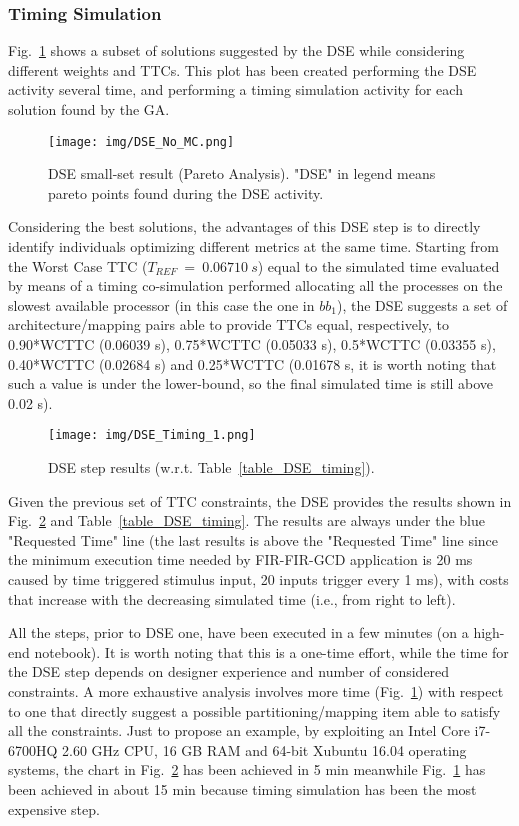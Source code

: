 \subsubsection{Timing Simulation}\label{firfirgcd_nomc}
%
Fig.~\ref{dse_small_01} shows a subset of solutions suggested by the DSE while considering different weights and TTCs. This plot has been created performing the DSE activity several time, and performing a timing simulation activity for each solution found by the GA.  \par
%
\begin{figure}[htbp]
	\centerline{\texttt{[image: img/DSE\_No\_MC.png]}}
	\caption{DSE small-set result (Pareto Analysis). "DSE" in legend means pareto points found during the DSE activity.}
	\label{dse_small_01}
\end{figure}
%
Considering the best solutions, the advantages of this DSE step is to directly identify individuals optimizing different metrics at the same time. Starting from the Worst Case TTC ($T_{REF} \ = \ 0.06710 \ s$) equal to the simulated time evaluated by means of a timing co-simulation performed allocating all the processes on the slowest available processor (in this case the one in $bb_1$), the DSE suggests a set of architecture/mapping pairs able to provide TTCs equal, respectively, to 0.90*WCTTC (0.06039 s), 0.75*WCTTC (0.05033 s), 0.5*WCTTC (0.03355 s), 0.40*WCTTC (0.02684 s) and 0.25*WCTTC (0.01678 s, it is worth noting that such a value is under the lower-bound, so the final simulated time is still above 0.02 s). \par
%
\begin{figure}[htbp]
	\centerline{\texttt{[image: img/DSE\_Timing\_1.png]}}
	\caption{DSE step results (w.r.t. Table~\ref{table_DSE_timing}).}
	\label{dse_small_02}
\end{figure}
%
Given the previous set of TTC constraints, the DSE provides the results shown in Fig.~\ref{dse_small_02} and Table~\ref{table_DSE_timing}. The results are always under the blue "Requested Time" line (the last results is above the "Requested Time" line since the minimum execution time needed by FIR-FIR-GCD application is 20 ms caused by time triggered stimulus input, 20 inputs trigger every 1 ms), with costs that increase with the decreasing simulated time (i.e., from right to left). \par
All the steps, prior to DSE one, have been executed in a few minutes (on a high-end notebook). It is worth noting that this is a one-time effort, while the time for the DSE step depends on designer experience and number of considered constraints. A more exhaustive analysis involves more time (Fig.~\ref{dse_small_01}) with respect to one that directly suggest a possible partitioning/mapping item able to satisfy all the constraints. Just to propose an example, by exploiting an Intel Core i7-6700HQ 2.60 GHz CPU, 16 GB RAM and 64-bit Xubuntu 16.04 operating systems, the chart in Fig.~\ref{dse_small_02} has been achieved in 5 min meanwhile Fig.~\ref{dse_small_01} has been achieved in about 15 min because timing simulation has been the most expensive step.
